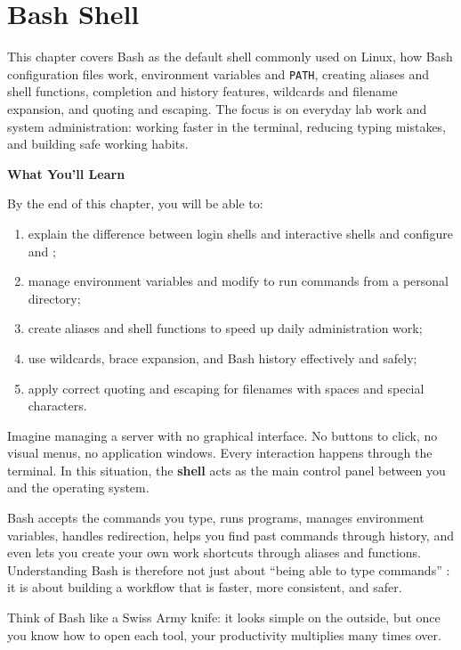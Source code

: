 
\chapter{Bash Shell}
\label{ch:bash-shell-basic}


This chapter covers Bash as the default shell commonly used on Linux, how
Bash configuration files work, environment variables and \texttt{PATH},
creating aliases and shell functions, completion and history features,
wildcards and filename expansion, and quoting and escaping. The focus is on
everyday lab work and system administration: working faster in the terminal,
reducing typing mistakes, and building safe working habits.

\textbf{What You'll Learn}

By the end of this chapter, you will be able to:

\begin{enumerate}
    \item explain the difference between login shells and interactive shells and configure  and ;
    \item manage environment variables and modify  to run commands from a personal directory;
    \item create aliases and shell functions to speed up daily administration work;
    \item use wildcards, brace expansion, and Bash history effectively and safely;
    \item apply correct quoting and escaping for filenames with spaces and special characters.
\end{enumerate}

\begin{examplebox}
Imagine managing a server with no graphical interface. No buttons to click,
no visual menus, no application windows. Every interaction happens through
the terminal. In this situation, the \textbf{shell} acts as the main control
panel between you and the operating system.

Bash accepts the commands you type, runs programs, manages environment
variables, handles redirection, helps you find past commands through history,
and even lets you create your own work shortcuts through aliases and
functions. Understanding Bash is therefore not just about ``being able to
type commands'' : it is about building a workflow that is faster, more
consistent, and safer.

Think of Bash like a Swiss Army knife: it looks simple on the outside, but
once you know how to open each tool, your productivity multiplies many times
over.
\end{examplebox}

